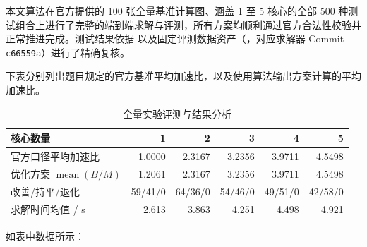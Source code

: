 \documentclass[anonymous,notoc]{gmcm2026}
\begin{document}
本文算法在官方提供的 100 张全量基准计算图、涵盖 1 至 5 核心的全部 500 种测试组合上进行了完整的端到端求解与评测，所有方案均顺利通过官方合法性校验并正常推进完成。测试结果依据 \texttt{} 以及固定评测数据资产（\texttt{}，对应求解器 Commit \texttt{c66559a}）进行了精确复核。

下表分别列出题目规定的官方基准平均加速比，以及使用算法输出方案计算的平均加速比。

\begin{table}[!htbp]\centering
\caption{全量实验评测与结果分析}\label{tab:05-p2-1}\small

\begin{tabularx}{\linewidth}{@{}Xrrrrr@{}}\toprule
核心数量 & 1 & 2 & 3 & 4 & 5 \\
\midrule
官方口径平均加速比 & 1.0000 & 2.3167 & 3.2356 & 3.9711 & 4.5498 \\
优化方案 $\operatorname{mean}(B/M)$ & 1.2061 & 2.3167 & 3.2356 & 3.9711 & 4.5498 \\
改善/持平/退化 & 59/41/0 & 64/36/0 & 54/46/0 & 49/51/0 & 42/58/0 \\
求解时间均值 / s & 2.613 & 3.863 & 4.251 & 4.498 & 4.921 \\
\bottomrule\end{tabularx}\end{table}

如表中数据所示：
\end{document}
